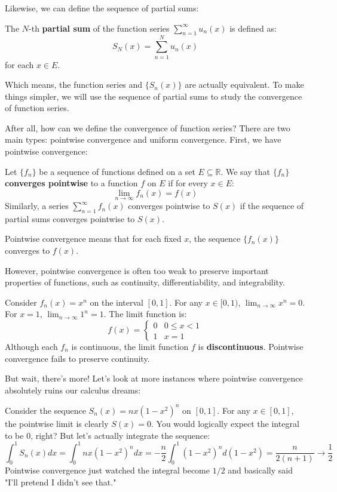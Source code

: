 Likewise, we can define the sequence of partial sums:

\begin{definition}
The $N$-th \textbf{partial sum} of the function series $\sum_{n=1}^{\infty} u_n(x)$ is defined as:
\[ S_N(x) = \sum_{n=1}^{N} u_n(x) \]
for each $x \in E$.
\end{definition}

Which means, the function series and $\{S_n(x)\}$ are actually equivalent. To make things simpler, we will use the sequence of partial sums to study the convergence of function series.

After all, how can we define the convergence of function series? There are two main types: pointwise convergence and uniform convergence. First, we have pointwise convergence:

\begin{definition}
Let $\{f_n\}$ be a sequence of functions defined on a set $E \subseteq \mathbb{R}$. We say that $\{f_n\}$ \textbf{converges pointwise} to a function $f$ on $E$ if for every $x \in E$:
\[ \lim_{n \to \infty} f_n(x) = f(x) \]
Similarly, a series $\sum_{n=1}^{\infty} f_n(x)$ converges pointwise to $S(x)$ if the sequence of partial sums converges pointwise to $S(x)$.
\end{definition}

Pointwise convergence means that for each fixed $x$, the sequence $\{f_n(x)\}$ converges to $f(x)$.

However, pointwise convergence is often too weak to preserve important properties of functions, such as continuity, differentiability, and integrability.

\begin{example}
Consider $f_n(x) = x^n$ on the interval $[0, 1]$.
For any $x \in [0, 1)$, $\lim_{n \to \infty} x^n = 0$. For $x = 1$, $\lim_{n \to \infty} 1^n = 1$.
The limit function is:
\[ f(x) = \begin{cases} 0 & 0 \le x < 1 \\ 1 & x = 1 \end{cases} \]
Although each $f_n$ is continuous, the limit function $f$ is \textbf{discontinuous}. Pointwise convergence fails to preserve continuity.
\end{example}

But wait, there's more! Let's look at more instances where pointwise convergence absolutely ruins our calculus dreams:

\begin{example}
Consider the sequence $S_n(x) = nx(1-x^2)^n$ on $[0,1]$.
For any $x \in [0, 1]$, the pointwise limit is clearly $S(x) = 0$. You would logically expect the integral to be $0$, right? But let's actually integrate the sequence:
\[ \int _0^1 S_n(x) dx = \int_0^1 nx(1-x^2)^n dx = -\frac{n}{2} \int_0^1 (1-x^2)^n d(1-x^2) = \frac{n}{2(n+1)} \to \frac{1}{2} \]
Pointwise convergence just watched the integral become $1/2$ and basically said "I'll pretend I didn't see that."
\end{example}


